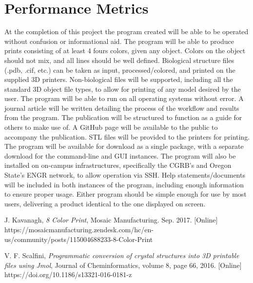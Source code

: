 \documentclass[onecolumn, draftclsnofoot,10pt, compsoc]{IEEEtran}
\begin{document}
\section{Performance Metrics}
At the completion of this project the program created will be able to be operated without confusion or informational aid.
The program will be able to produce prints consisting of at least 4 fours colors, given any object.
Colors on the object should not mix, and all lines should be well defined.
Biological structure files (.pdb, .cif, etc.) can be taken as input, processed/colored, and printed on the supplied 3D printers.
Non-biological files will be supported, including all the standard 3D object file types, to allow for printing of any model desired by the user.
The program will be able to run on all operating systems without error.
A journal article will be written detailing the process of the workflow and results from the program.
The publication will be structured to function as a guide for others to make use of.
A GitHub page will be available to the public to accompany the publication.
STL files will be provided to the printers for printing.
The program will be available for download as a single package, with a separate download for the command-line and GUI instances.
The program will also be installed on on-campus infrastructures, specifically the CGRB’s and Oregon State’s ENGR network, to allow operation via SSH.
Help statements/documents will be included in both instances of the program, including enough information to ensure proper usage.
Either program should be simple enough for use by most users, delivering a product identical to the one displayed on screen. 

\begin{thebibliography}{9}

	J. Kavanagh, 
	{\em 8 Color Print}, 
	Mosaic Manufacturing. 
	Sep. 2017. 
	[Online] https://mosaicmanufacturing.zendesk.com/hc/en-us/community/posts/115004688233-8-Color-Print

	V. F. Scalfini, 
	{\em Programmatic conversion of crystal structures into 3D printable files using Jmol}, 
	Journal of Cheminformatics, 
	volume 8, 
	page 66, 
	2016. 
	[Online] https://doi.org/10.1186/s13321-016-0181-z

\end{thebibliography}
\end{document}
